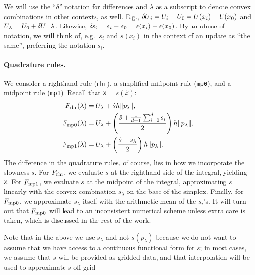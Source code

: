 \documentclass[smallcondensed]{svjour3}
\begin{document}
We will use the ``$\delta$'' notation for differences and $\lambda$ as
a subscript to denote convex combinations in other contexts, as
well. E.g., ${\delta \hspace{-0.09em} U}_i = U_i - U_0 = U(x_i) - U(x_0)$ and
$U_\lambda = U_0 + {\delta \hspace{-0.09em} U}^\top \lambda$. Likewise,
${\delta \hspace{-0.1em} s}_i = s_i - s_0 = s(x_i) - s(x_0)$. By an abuse of notation, we
will think of, e.g., $s_i$ and $s(x_i)$ in the context of an update as
``the same'', preferring the notation $s_i$.

\paragraph{Quadrature rules.} We consider a righthand rule
(\texttt{rhr}), a simplified midpoint rule (\texttt{mp0}), and a
midpoint rule (\texttt{mp1}). Recall that $\hat{s} = s(\hat{x})$:
\begin{align}
  F_{\operatorname{rhr}}(\lambda) &= U_\lambda + \hat{s} h \|p_\lambda\|, \\
  F_{\operatorname{mp0}}(\lambda) &= U_\lambda + \left(\frac{\hat{s} + \tfrac{1}{d+1} \sum_{i=0}^d s_i}{2}\right) h \|p_\lambda\|, \\
  F_{\operatorname{mp1}}(\lambda) &= U_\lambda + \left(\frac{\hat{s} + s_\lambda}{2}\right) h \|p_\lambda\|.
\end{align}
The difference in the quadrature rules, of course, lies in how we
incorporate the slowness $s$. For $F_{\operatorname{rhr}}$, we evaluate $s$ at the
righthand side of the integral, yielding $\hat{s}$. For $F_{\operatorname{mp1}}$, we
evaluate $s$ at the midpoint of the integral, approximating $s$
linearly with the convex combination $s_\lambda$ on the base of the
simplex. Finally, for $F_{\operatorname{mp0}}$, we approximate $s_\lambda$ itself
with the arithmetic mean of the $s_i$'s. It will turn out that
$F_{\operatorname{mp0}}$ will lead to an inconsistent numerical scheme unless extra
care is taken, which is discussed in the rest of the work.

Note that in the above we use $s_\lambda$ and not $s(p_\lambda)$
because we do not want to assume that we have access to a continuous
functional form for $s$; in most cases, we assume that $s$ will be
provided as gridded data, and that interpolation will be used to
approximate $s$ off-grid.
\end{document}
